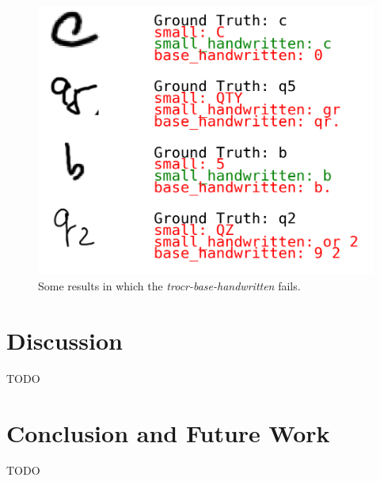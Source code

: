 \documentclass[conference]{IEEEtran}
\begin{document}
\begin{figure}[H]
\centering
\includegraphics[width=\linewidth]{text_digitization_results_2.png}
\caption{Some results in which the \textit{trocr-base-handwritten} fails.}
\label{fig:text_digitization_results_2}
\end{figure}

\section{Discussion}
TODO

\section{Conclusion and Future Work}
TODO



\end{document}
